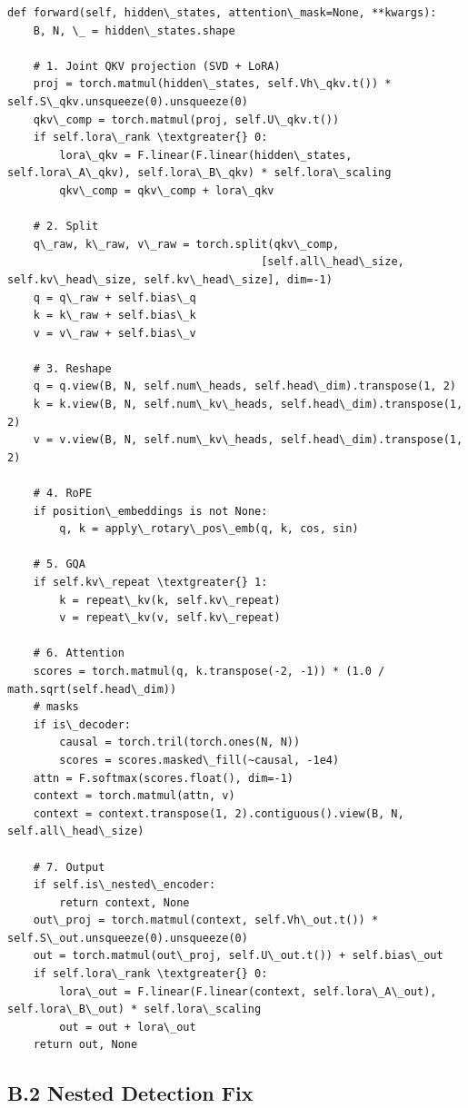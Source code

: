 \begin{lstlisting}
def forward(self, hidden\_states, attention\_mask=None, **kwargs):
    B, N, \_ = hidden\_states.shape
    
    # 1. Joint QKV projection (SVD + LoRA)
    proj = torch.matmul(hidden\_states, self.Vh\_qkv.t()) * self.S\_qkv.unsqueeze(0).unsqueeze(0)
    qkv\_comp = torch.matmul(proj, self.U\_qkv.t())
    if self.lora\_rank \textgreater{} 0:
        lora\_qkv = F.linear(F.linear(hidden\_states, self.lora\_A\_qkv), self.lora\_B\_qkv) * self.lora\_scaling
        qkv\_comp = qkv\_comp + lora\_qkv
    
    # 2. Split
    q\_raw, k\_raw, v\_raw = torch.split(qkv\_comp, 
                                       [self.all\_head\_size, self.kv\_head\_size, self.kv\_head\_size], dim=-1)
    q = q\_raw + self.bias\_q
    k = k\_raw + self.bias\_k
    v = v\_raw + self.bias\_v
    
    # 3. Reshape
    q = q.view(B, N, self.num\_heads, self.head\_dim).transpose(1, 2)
    k = k.view(B, N, self.num\_kv\_heads, self.head\_dim).transpose(1, 2)
    v = v.view(B, N, self.num\_kv\_heads, self.head\_dim).transpose(1, 2)
    
    # 4. RoPE
    if position\_embeddings is not None:
        q, k = apply\_rotary\_pos\_emb(q, k, cos, sin)
    
    # 5. GQA
    if self.kv\_repeat \textgreater{} 1:
        k = repeat\_kv(k, self.kv\_repeat)
        v = repeat\_kv(v, self.kv\_repeat)
    
    # 6. Attention
    scores = torch.matmul(q, k.transpose(-2, -1)) * (1.0 / math.sqrt(self.head\_dim))
    # masks
    if is\_decoder:
        causal = torch.tril(torch.ones(N, N))
        scores = scores.masked\_fill(~causal, -1e4)
    attn = F.softmax(scores.float(), dim=-1)
    context = torch.matmul(attn, v)
    context = context.transpose(1, 2).contiguous().view(B, N, self.all\_head\_size)
    
    # 7. Output
    if self.is\_nested\_encoder:
        return context, None
    out\_proj = torch.matmul(context, self.Vh\_out.t()) * self.S\_out.unsqueeze(0).unsqueeze(0)
    out = torch.matmul(out\_proj, self.U\_out.t()) + self.bias\_out
    if self.lora\_rank \textgreater{} 0:
        lora\_out = F.linear(F.linear(context, self.lora\_A\_out), self.lora\_B\_out) * self.lora\_scaling
        out = out + lora\_out
    return out, None
\end{lstlisting}

\subsection{B.2 Nested Detection Fix}


